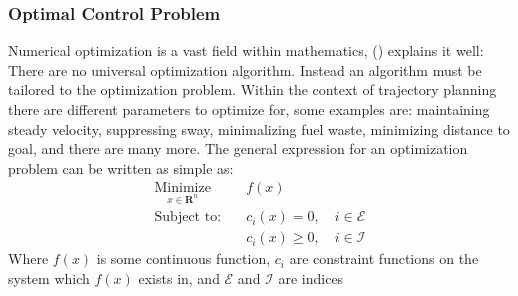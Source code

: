 \subsubsection*{Optimal Control Problem}
Numerical optimization is a vast field within mathematics, (\cite{wright1999numerical}) explains it well: There are no universal optimization algorithm. Instead an algorithm must be tailored to the optimization
problem. Within the context of trajectory planning there are different parameters to optimize for, some examples are: maintaining steady velocity, suppressing sway, minimalizing
fuel waste, minimizing distance to goal, and there are many more. The general expression for an optimization problem can be written as simple as:
\begin{subequations}
    \begin{align}
    \underset{x\in \textbf{R}^n}{\textrm{Minimize}} \quad & f(x) \\
        \textrm{Subject to:} \quad & c_i(x) = 0, \quad i \in \mathcal{E} \\
                             \quad & c_i(x) \geq 0, \quad i \in \mathcal{I} 
    \end{align}
\end{subequations}
Where $f(x)$ is some continuous function, $c_i$ are constraint functions on the system which $f(x)$ exists in, and $\mathcal{E}$ and $\mathcal{I}$ are indices
